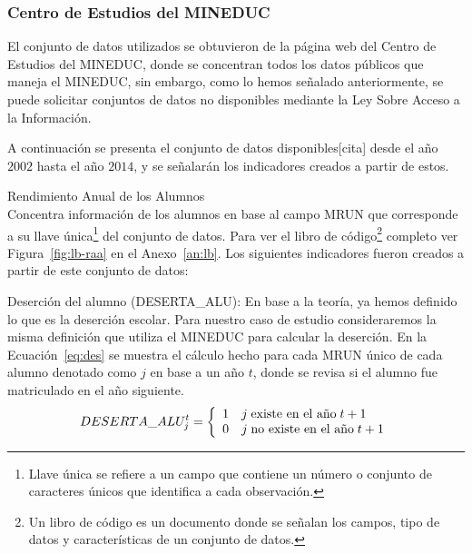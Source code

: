 \subsubsection{Centro de Estudios del MINEDUC}
    El conjunto de datos utilizados se obtuvieron de la página web del Centro de Estudios del MINEDUC, donde se concentran todos los datos públicos que maneja el MINEDUC, sin embargo, como lo hemos señalado anteriormente, se puede solicitar conjuntos de datos no disponibles mediante la Ley Sobre Acceso a la Información.
    
    A continuación se presenta el conjunto de datos disponibles[cita] desde el año $2002$ hasta el año $2014$, y se señalarán los indicadores creados a partir de estos.
    \begin{longdescription}
        \item[Rendimiento Anual de los Alumnos] \hfill \\
        Concentra información de los alumnos en base al campo MRUN que corresponde a su llave única\footnote{Llave única se refiere a un campo que contiene un número o conjunto de caracteres únicos que identifica a cada observación.} del conjunto de datos. Para ver el libro de código\footnote{Un libro de código es un documento donde se señalan los campos, tipo de datos y características de un conjunto de datos.} completo ver Figura~\ref{fig:lb-raa} en el Anexo~\ref{an:lb}.
        Los siguientes indicadores fueron creados a partir de este conjunto de datos:
            \begin{longdescription}
              \item[Deserción del alumno] (DESERTA\_ALU): En base a la teoría, ya hemos definido lo que es la deserción escolar. Para nuestro caso de estudio consideraremos la misma definición que utiliza el MINEDUC para calcular la deserción.
              En la Ecuación~\ref{eq:des} se muestra el cálculo hecho para cada MRUN único de cada alumno denotado como $j$ en base a un año $t$, donde se revisa si el alumno fue matriculado en el año siguiente.
              \begin{equation}
              \centering
              DESERTA\_ALU_{j}^{t} = \left\{
                \begin{array}{c l}
                 1 & j \; \mbox{existe en el año} \; t + 1\\
                 0 & j \; \mbox{no existe en el año} \; t + 1
                \end{array}
                \right.
                \label{eq:des}
              \end{equation}
                

\end{longdescription}
\end{longdescription}
